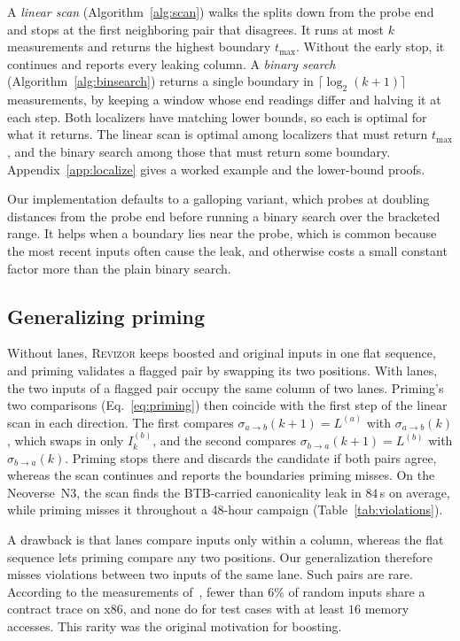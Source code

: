 \documentclass[letterpaper,twocolumn,10pt]{article}
\theoremstyle{definition}
\providecommand{\lane}[1]{\ensuremath{L^{(#1)}}}
\providecommand{\inp}[2]{\ensuremath{I_{#1}^{(#2)}}}
\providecommand{\spl}[1]{\ensuremath{\sigma_{a\to b}(#1)}}
\providecommand{\tmax}{\ensuremath{t_{\max}}}
\newif\ifdraft \draftfalse
\newcommand{\todo}[1]{\ifdraft{\textcolor{red}{[\textbf{TODO:} #1]}}\fi}
\begin{document}
A \emph{linear scan} (Algorithm~\ref{alg:scan}) walks the splits down from the probe end and stops
at the first neighboring pair that disagrees. It runs at most $k$ measurements and returns the
highest boundary $\tmax$. Without the early stop, it continues and reports every leaking column. A
\emph{binary search} (Algorithm~\ref{alg:binsearch}) returns a single boundary in
$\lceil\log_2(k+1)\rceil$ measurements, by keeping a window whose end readings differ and halving
it at each step. Both localizers have matching lower bounds, so each is optimal for what it
returns. The linear scan is optimal among localizers that must return $\tmax$, and the binary
search among those that must return some boundary. Appendix~\ref{app:localize} gives a worked
example and the lower-bound proofs.

Our implementation defaults to a galloping variant, which probes at doubling distances from the
probe end before running a binary search over the bracketed range. It helps when a boundary lies
near the probe, which is common because the most recent inputs often cause the leak, and otherwise
costs a small constant factor more than the plain binary search.

\subsection{Generalizing priming}
\label{sec:detect-priming}

Without lanes, \textsc{Revizor} keeps boosted and original inputs in one flat sequence,
and priming validates a flagged pair by swapping its two positions. With lanes, the two
inputs of a flagged pair occupy the same column of two lanes. Priming's two comparisons
(Eq.~\eqref{eq:priming}) then coincide with the first step of the linear scan in each direction.
The first compares $\spl{k{+}1}=\lane{a}$ with $\spl{k}$, which swaps in only $\inp{k}{b}$, and
the second compares $\sigma_{b\to a}(k{+}1)=\lane{b}$ with $\sigma_{b\to a}(k)$. Priming stops
there and discards the candidate if both pairs agree, whereas the scan continues and reports the
boundaries priming misses. On the Neoverse~N3, the scan finds the BTB-carried canonicality leak
in $84$\,s on average, while priming misses it throughout a 48-hour campaign
(Table~\ref{tab:violations}).

A drawback is that lanes compare inputs only within a column, whereas the flat sequence lets
priming compare any two positions. Our generalization therefore misses violations between two
inputs of the same lane. Such pairs are rare. According to the measurements of~\cite{hide_seek},
fewer than $6\%$ of random inputs share a contract trace on x86, and none do for test cases with
at least $16$ memory accesses. This rarity was the original motivation for boosting.
\todo{Is ``generalization'' the right term? Lanes do not keep priming's within-lane comparisons.}
\end{document}
